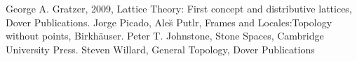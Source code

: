 \documentclass[a4j,12pt]{jarticle}
\numberwithin{equation}{section}
\begin{document}
\begin{thebibliography}{10}
  George A. Gratzer, 2009, Lattice Theory: First concept and distributive lattices, Dover Publications.
  Jorge Picado, Ale\u{s} Putlr, Frames and Locales:Topology without points, Birkh\"auser.
  Peter T. Johnstone, Stone Spaces, Cambridge University Press.
  Steven Willard, General Topology, Dover Publications
\end{thebibliography}
\end{document}
